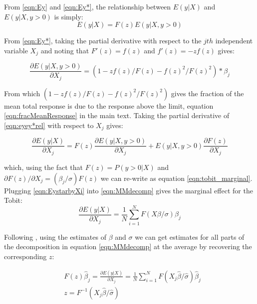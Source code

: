 \documentclass[preprint,12pt,authoryear]{elsarticle}
\begin{document}
	
	From \ref{eqn:Ey} and \ref{eqn:Ey*}, the relationship between $E(y|X)$ and $E(y|X,y>0)$ is simply:
	\begin{equation}
	E(y|X) = F(z)E(y|X, y>0)
	\label{eqn:eyey*rel}
	\end{equation}
	
	
	From \ref{eqn:Ey*}, taking the partial derivative with respect to the $jth$ independent variable  $X_j$ and noting that $F'(z) =  f(z)$ and $f'(z) = -zf(z)$ gives: 
	
	\begin{equation}
	\frac{\partial E(y|X,y>0)}{\partial X_j} = (1-zf(z)/F(z) - f(z)^2/F(z)^2)*\beta_j
	\label{eqn:EystarbyXi}
	\end{equation}
	
	
	\noindent From which $(1-zf(z)/F(z) - f(z)^2/F(z)^2)$ gives the fraction of the mean total response is due to the response above the limit, equation \ref{eqn:fracMeanResponse} in the main text.
	Taking the partial derivative of \ref{eqn:eyey*rel} with respect to $X_j$ gives: 
	
	\begin{equation}
	\frac{\partial E(y|X)}{\partial X_j} = F(z)\frac{\partial E(y|X,y>0)}{\partial X_j} +  E(y|X, y>0)\frac{\partial F(z)}{\partial X_j} 
	\label{eqn:MMdecomp}
	\end{equation}
	
	which, using the fact that $F(z) = P(y>0|X)$ and $\partial{F(z)}/\partial{X_j} = (\beta_j/\sigma)F(z)$  we can re-write as equation \ref{eqn:tobit_marginal}.
	Plugging \ref{eqn:EystarbyXi} into \ref{eqn:MMdecomp} gives the marginal effect for the Tobit:
	\begin{equation}
	\frac{\partial E(y|X)}{\partial X_j} = \frac{1}{N} \sum_{i=1}^N F(X\beta/ \sigma) \beta_j 
	\label{eqn:marginalTobit}
	\end{equation}
	
	
	\noindent Following \cite{Mcdonald1980}, using the estimates of $\beta$ and $\sigma$ we can get estimates for all parts of the decomposition in equation \ref{eqn:MMdecomp} at the average by recovering the corresponding $z$:
	
	\begin{align*}
	\label{eqn:decomposition}
	& F(z)\hat{\beta}_j = \frac{\partial E(y|X)}{\partial X_j} = \frac{1}{N} \sum_{i=1}^N F(X_j \hat{\beta}/ \hat{\sigma})\hat \beta_j \\
	& z = F^{-1}(X_j \hat{\beta}/ \hat{\sigma}) \\
	\end{align*}

	
	\newpage
	
	
	
\end{document}
